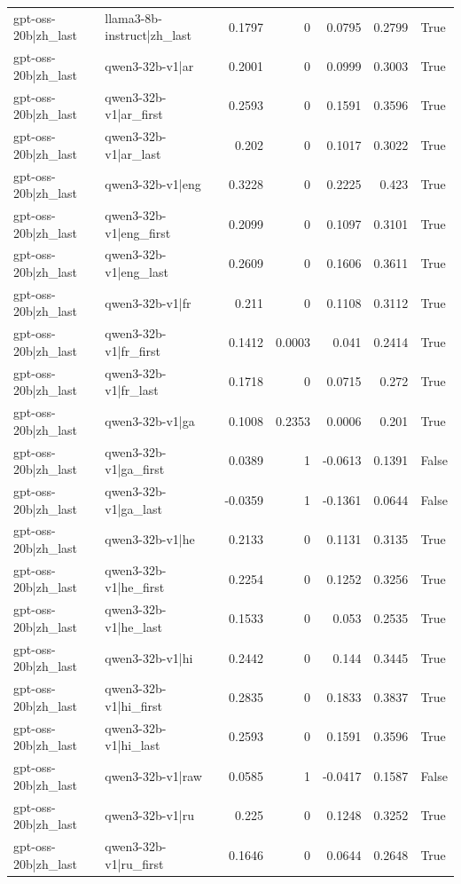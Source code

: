 \begin{table}
\begin{tabular}{l l r r r r l}
gpt-oss-20b|zh_last & llama3-8b-instruct|zh_last & 0.1797 & 0 & 0.0795 & 0.2799 & True \\
gpt-oss-20b|zh_last & qwen3-32b-v1|ar & 0.2001 & 0 & 0.0999 & 0.3003 & True \\
gpt-oss-20b|zh_last & qwen3-32b-v1|ar_first & 0.2593 & 0 & 0.1591 & 0.3596 & True \\
gpt-oss-20b|zh_last & qwen3-32b-v1|ar_last & 0.202 & 0 & 0.1017 & 0.3022 & True \\
gpt-oss-20b|zh_last & qwen3-32b-v1|eng & 0.3228 & 0 & 0.2225 & 0.423 & True \\
gpt-oss-20b|zh_last & qwen3-32b-v1|eng_first & 0.2099 & 0 & 0.1097 & 0.3101 & True \\
gpt-oss-20b|zh_last & qwen3-32b-v1|eng_last & 0.2609 & 0 & 0.1606 & 0.3611 & True \\
gpt-oss-20b|zh_last & qwen3-32b-v1|fr & 0.211 & 0 & 0.1108 & 0.3112 & True \\
gpt-oss-20b|zh_last & qwen3-32b-v1|fr_first & 0.1412 & 0.0003 & 0.041 & 0.2414 & True \\
gpt-oss-20b|zh_last & qwen3-32b-v1|fr_last & 0.1718 & 0 & 0.0715 & 0.272 & True \\
gpt-oss-20b|zh_last & qwen3-32b-v1|ga & 0.1008 & 0.2353 & 0.0006 & 0.201 & True \\
gpt-oss-20b|zh_last & qwen3-32b-v1|ga_first & 0.0389 & 1 & -0.0613 & 0.1391 & False \\
gpt-oss-20b|zh_last & qwen3-32b-v1|ga_last & -0.0359 & 1 & -0.1361 & 0.0644 & False \\
gpt-oss-20b|zh_last & qwen3-32b-v1|he & 0.2133 & 0 & 0.1131 & 0.3135 & True \\
gpt-oss-20b|zh_last & qwen3-32b-v1|he_first & 0.2254 & 0 & 0.1252 & 0.3256 & True \\
gpt-oss-20b|zh_last & qwen3-32b-v1|he_last & 0.1533 & 0 & 0.053 & 0.2535 & True \\
gpt-oss-20b|zh_last & qwen3-32b-v1|hi & 0.2442 & 0 & 0.144 & 0.3445 & True \\
gpt-oss-20b|zh_last & qwen3-32b-v1|hi_first & 0.2835 & 0 & 0.1833 & 0.3837 & True \\
gpt-oss-20b|zh_last & qwen3-32b-v1|hi_last & 0.2593 & 0 & 0.1591 & 0.3596 & True \\
gpt-oss-20b|zh_last & qwen3-32b-v1|raw & 0.0585 & 1 & -0.0417 & 0.1587 & False \\
gpt-oss-20b|zh_last & qwen3-32b-v1|ru & 0.225 & 0 & 0.1248 & 0.3252 & True \\
gpt-oss-20b|zh_last & qwen3-32b-v1|ru_first & 0.1646 & 0 & 0.0644 & 0.2648 & True \\

\end{tabular}
\end{table}
